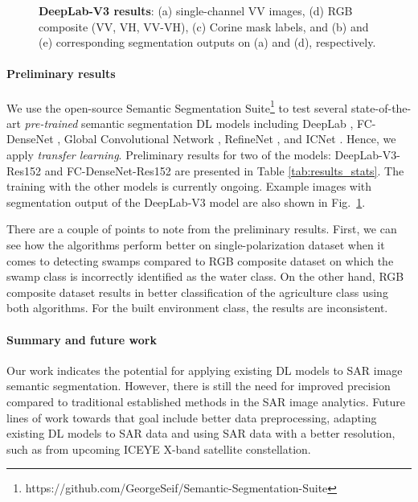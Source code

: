 \documentclass[a4paper]{article}
\begin{document}
\begin{figure}
\medskip
\caption{\textbf{DeepLab-V3 results}: (a) single-channel VV images, (d) RGB composite (VV, VH, VV-VH), (c) Corine mask labels, and (b) and (e) corresponding segmentation outputs on (a) and (d), respectively. }
\label{fig:example_res_images}
\end{figure}

\paragraph{Preliminary results}
We use the open-source Semantic Segmentation Suite\footnote{https://github.com/GeorgeSeif/Semantic-Segmentation-Suite} to test several state-of-the-art \textit{pre-trained} semantic segmentation DL models \cite{garcia2017review} including DeepLab \cite{chen2018deeplab}, FC-DenseNet \cite{jegou2017one}, Global Convolutional Network \cite{peng2017large}, RefineNet \cite{lin2017refinenet}, and ICNet \cite{zhao2017icnet}. Hence, we apply \textit{transfer learning}.
Preliminary results for two of the models: DeepLab-V3-Res152 and FC-DenseNet-Res152 are presented in Table  
\ref{tab:results_stats}. The training with the other models is currently ongoing. Example images with segmentation output of the DeepLab-V3 model are also shown in Fig.\ \ref{fig:example_res_images}. 

There are a couple of points to note from the preliminary results. First, we can see how the algorithms perform better on single-polarization dataset when it comes to detecting swamps compared to RGB composite dataset on which the swamp class is incorrectly identified as the water class. On the other hand,  RGB composite dataset results in better classification of the agriculture class using both algorithms. For the built environment class, the results are inconsistent.

\paragraph{Summary and future work}
Our work indicates the potential for applying existing DL models to SAR image semantic segmentation. However, there is still the need for improved precision compared to traditional established methods in the SAR image analytics. Future lines of work towards that goal include better data preprocessing, adapting existing DL models to SAR data and using SAR data with a better resolution, such as from upcoming ICEYE X-band satellite constellation. 
\end{document}
